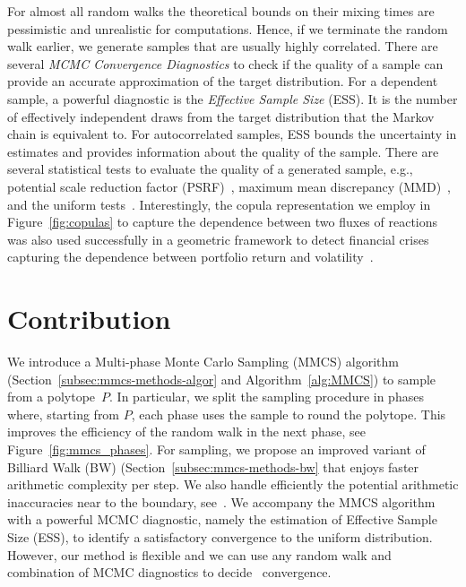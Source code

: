    For almost all random walks the theoretical bounds on their mixing times are
   pessimistic and unrealistic for  computations. Hence,
   if we terminate the random walk earlier, we generate samples that are  usually highly correlated.
   There are several \textit{MCMC Convergence Diagnostics} \citep{Roy20} to check
   if  the quality of a  sample can  provide an accurate
   approximation of the target distribution. For a dependent sample, a powerful
   diagnostic is the \textit {Effective Sample Size} (ESS). It is the number of
   effectively independent draws from the target distribution that the Markov chain
   is equivalent to. For autocorrelated samples, ESS bounds
   the uncertainty in estimates \citep{geyer92} and provides  information about
   the quality of the sample. There are several statistical tests to evaluate the quality of a generated sample, e.g., potential scale reduction factor (PSRF)~\citep{Gelman92}, maximum mean discrepancy (MMD)~\citep{Gretton12},
   and the uniform tests~\citep{CousinsThesis17}.
   Interestingly, 
   the copula representation we employ in Figure~\ref{fig:copulas} to capture the dependence between two fluxes of reactions 
   was also used successfully in a geometric framework to detect financial crises capturing the dependence 
   between portfolio return and volatility~\citep{Cales18}.


\section{Contribution}
\label{sec:mmcs-contribution}

   We introduce a Multi-phase Monte Carlo Sampling (MMCS) algorithm
   (Section~\ref{subsec:mmcs-methods-algor} and Algorithm~\ref{alg:MMCS}) to sample from a polytope~$P$. In
   particular, we split the sampling procedure in phases where, starting from $P$,
   each phase uses the sample to round the polytope. This improves the efficiency
   of the random walk in the next phase, see Figure~\ref{fig:mmcs_phases}.
   For sampling, we propose an improved variant of Billiard Walk (BW)
   (Section~\ref{subsec:mmcs-methods-bw} that enjoys faster
   arithmetic complexity per step. We also handle efficiently the potential arithmetic inaccuracies near to the boundary, see~\citep{ChePioCaz18}.
   We accompany the MMCS algorithm with a powerful MCMC diagnostic, namely the
   estimation of Effective Sample Size (ESS), to identify a satisfactory
   convergence to the uniform distribution.
   However, our method is flexible and  we can
   use any  random walk and
   combination of MCMC diagnostics to decide~
   convergence.

